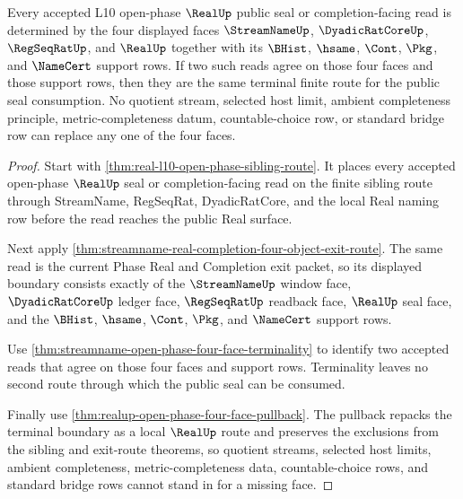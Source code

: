 \begin{theorem}
\label{thm:real-open-phase-four-object-terminal-route}
Every accepted L10 open-phase $\RealUp$ public seal or completion-facing read is determined by the four displayed faces $\StreamNameUp$, $\DyadicRatCoreUp$, $\RegSeqRatUp$, and $\RealUp$ together with its $\BHist$, $\hsame$, $\Cont$, $\Pkg$, and $\NameCert$ support rows. If two such reads agree on those four faces and those support rows, then they are the same terminal finite route for the public seal consumption. No quotient stream, selected host limit, ambient completeness principle, metric-completeness datum, countable-choice row, or standard bridge row can replace any one of the four faces.
\end{theorem}
\begin{proof}
Start with \autoref{thm:real-l10-open-phase-sibling-route}. It places every accepted open-phase $\RealUp$ seal or completion-facing read on the finite sibling route through StreamName, RegSeqRat, DyadicRatCore, and the local Real naming row before the read reaches the public Real surface.

Next apply \autoref{thm:streamname-real-completion-four-object-exit-route}. The same read is the current Phase Real and Completion exit packet, so its displayed boundary consists exactly of the $\StreamNameUp$ window face, $\DyadicRatCoreUp$ ledger face, $\RegSeqRatUp$ readback face, $\RealUp$ seal face, and the $\BHist$, $\hsame$, $\Cont$, $\Pkg$, and $\NameCert$ support rows.

Use \autoref{thm:streamname-open-phase-four-face-terminality} to identify two accepted reads that agree on those four faces and support rows. Terminality leaves no second route through which the public seal can be consumed.

Finally use \autoref{thm:realup-open-phase-four-face-pullback}. The pullback repacks the terminal boundary as a local $\RealUp$ route and preserves the exclusions from the sibling and exit-route theorems, so quotient streams, selected host limits, ambient completeness, metric-completeness data, countable-choice rows, and standard bridge rows cannot stand in for a missing face.
\end{proof}

